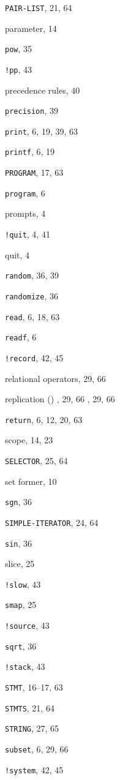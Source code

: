\begin{theindex}
\item {{\tt PAIR-LIST}}, 21, 64
\item {parameter}, 14
\item {{\tt pow}}, 35
\item {{\tt !pp}}, 43
\item {precedence rules}, 40
\item {{\tt precision}}, 39
\item {{\tt print}}, 6, 19, 39, 63
\item {{\tt printf}}, 6, 19
\item {{\tt PROGRAM}}, 17, 63
\item {{\tt program}}, 6
\item {prompts}, 4
\indexspace
\item {{\tt !quit}}, 4, 41
\item {quit}, 4
\indexspace
\item {{\tt random}}, 36, 39
\item {{\tt randomize}}, 36
\item {{\tt read}}, 6, 18, 63
\item {{\tt readf}}, 6
\item {{\tt !record}}, 42, 45
\item {relational operators}, 29, 66
\item {replication ({\tt *})}
	, 29, 66
	, 29, 66
\item {{\tt return}}, 6, 12, 20, 63
\indexspace
\item {scope}, 14, 23
\item {{\tt SELECTOR}}, 25, 64
\item {set former}, 10
\item {{\tt sgn}}, 36
\item {{\tt SIMPLE-ITERATOR}}, 24, 64
\item {{\tt sin}}, 36
\item {slice}, 25
\item {{\tt !slow}}, 43
\item {{\tt smap}}, 25
\item {{\tt !source}}, 43
\item {{\tt sqrt}}, 36
\item {{\tt !stack}}, 43
\item {{\tt STMT}}, 16--17, 63
\item {{\tt STMTS}}, 21, 64
\item {{\tt STRING}}, 27, 65
\item {{\tt subset}}, 6, 29, 66
\item {{\tt !system}}, 42, 45

\end{theindex}
